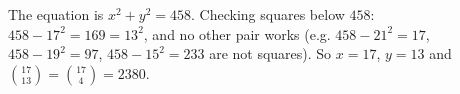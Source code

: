 The equation is $x^2+y^2=458$. Checking squares below $458$: $458-17^2=169=13^2$, and no other pair works (e.g. $458-21^2=17$, $458-19^2=97$, $458-15^2=233$ are not squares). So $x=17$, $y=13$ and $\binom{17}{13}=\binom{17}4=\boxed{2380}$.

